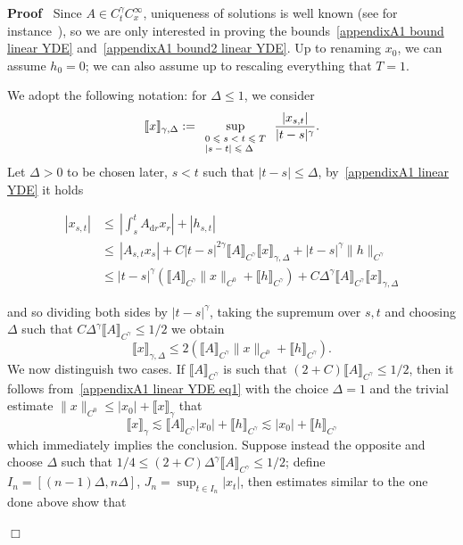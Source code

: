 \documentclass[10pt]{article}
\newcommand{\assign}{:=}
\newcommand{\mathd}{\mathrm{d}}
\newcommand{\tmscript}[1]{\text{\scriptsize{$#1$}}}
\newenvironment{proof}{\noindent\textbf{Proof\ }}{\hspace*{\fill}$\Box$\medskip}
\begin{document}
\begin{proof}
  Since $A \in C^{\gamma}_t C^{\infty}_x$, uniqueness of solutions is well
  known (see for instance~{\cite{lejay}}), so we are only interested in
  proving the bounds~{\eqref{appendixA1 bound linear YDE}}
  and~{\eqref{appendixA1 bound2 linear YDE}}. Up to renaming $x_0$, we can
  assume $h_0 = 0$; we can also assume up to rescaling everything that $T =
  1$.
  
  We adopt the following notation: for $\Delta \leqslant 1$, we consider
  \[ \llbracket x \rrbracket_{\gamma, \Delta} \assign
     \sup_{\tmscript{\begin{array}{l}
       0 \leqslant s < t \leqslant T\\
       | s - t | \leqslant \Delta
     \end{array}}}  \frac{| x_{s, t} |}{| t - s |^{\gamma}} . \]
  Let $\Delta > 0$ to be chosen later, $s < t$ such that $| t - s | \leqslant
  \Delta$, by~{\eqref{appendixA1 linear YDE}} it holds
  
  \begin{align*}
    | x_{s, t} | & \leqslant \, \left| \int_s^t A_{\mathd r} x_r \right| + |
    h_{s, t} |\\
    & \leqslant \, | A_{s, t} x_s | + C | t - s |^{2 \gamma} \llbracket A
    \rrbracket_{C^{\gamma}}  \llbracket x \rrbracket_{\gamma, \Delta} + | t -
    s |^{\gamma} \| h \|_{C^{\gamma}}\\
    & \leqslant | t - s |^{\gamma} (\llbracket A \rrbracket_{C^{\gamma}} \| x
    \|_{C^0} + \llbracket h \rrbracket_{C^{\gamma}}) + C \Delta^{\gamma}
    \llbracket A \rrbracket_{C^{\gamma}} \llbracket x \rrbracket_{\gamma,
    \Delta}
  \end{align*}
  
  and so dividing both sides by $| t - s |^{\gamma}$, taking the supremum over
  $s, t$ and choosing $\Delta$ such that $C \Delta^{\gamma} \llbracket A
  \rrbracket_{C^{\gamma}} \leqslant 1 / 2$ we obtain
  \begin{equation}
    \llbracket x \rrbracket_{\gamma, \Delta} \leqslant 2 (\llbracket A
    \rrbracket_{C^{\gamma}} \| x \|_{C^0} + \llbracket h
    \rrbracket_{C^{\gamma}}) . \label{appendixA1 linear YDE eq1}
  \end{equation}
  We now distinguish two cases. If $\llbracket A \rrbracket_{C^{\gamma}}$ is
  such that $(2 + C) \llbracket A \rrbracket_{C^{\gamma}} \leqslant 1 / 2$,
  then it follows from~{\eqref{appendixA1 linear YDE eq1}} with the choice
  $\Delta = 1$ and the trivial estimate $\| x \|_{C^0} \leqslant | x_0 | +
  \llbracket x \rrbracket_{\gamma}$ that
  \[ \llbracket x \rrbracket_{\gamma} \lesssim \llbracket A
     \rrbracket_{C^{\gamma}} | x_0 | + \llbracket h \rrbracket_{C^{\gamma}}
     \lesssim | x_0 | + \llbracket h \rrbracket_{C^{\gamma}} \]
  which immediately implies the conclusion. Suppose instead the opposite and
  choose $\Delta$ such that $1 / 4 \leqslant (2 + C) \Delta^{\gamma}
  \llbracket A \rrbracket_{C^{\gamma}} \leqslant 1 / 2$; define $I_n = [(n -
  1) \Delta, n \Delta]$, $J_n = \sup_{t \in I_n} | x_t |$, then estimates
  similar to the one done above show that
  

\end{proof}
\end{document}
